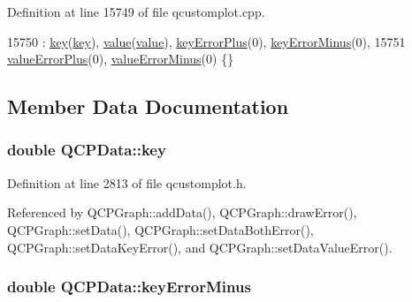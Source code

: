 Definition at line 15749 of file qcustomplot.\+cpp.


\begin{DoxyCode}
15750     : \hyperlink{class_q_c_p_data_a2f5ba9aca61bb74f88516e148a4cf71b}{key}(\hyperlink{class_q_c_p_data_a2f5ba9aca61bb74f88516e148a4cf71b}{key}), \hyperlink{class_q_c_p_data_aefe1ecf8fa2e34ed875b67523e542373}{value}(\hyperlink{class_q_c_p_data_aefe1ecf8fa2e34ed875b67523e542373}{value}), \hyperlink{class_q_c_p_data_ae468c3808107c2fd23052481156ab5b5}{keyErrorPlus}(0), 
      \hyperlink{class_q_c_p_data_af107d650b8ee5c3b2961ecddcfb1bccb}{keyErrorMinus}(0),
15751       \hyperlink{class_q_c_p_data_ad26912552d03485ea20d91dcad16aa8f}{valueErrorPlus}(0), \hyperlink{class_q_c_p_data_a51d8f42bf4d49a1f263531e70cadd6a3}{valueErrorMinus}(0) \{\}
\end{DoxyCode}


\subsection{Member Data Documentation}
\hypertarget{class_q_c_p_data_a2f5ba9aca61bb74f88516e148a4cf71b}{}
\subsubsection[{key}]{\setlength{\rightskip}{0pt plus 5cm}double Q\+C\+P\+Data\+::key}\label{class_q_c_p_data_a2f5ba9aca61bb74f88516e148a4cf71b}


Definition at line 2813 of file qcustomplot.\+h.



Referenced by Q\+C\+P\+Graph\+::add\+Data(), Q\+C\+P\+Graph\+::draw\+Error(), Q\+C\+P\+Graph\+::set\+Data(), Q\+C\+P\+Graph\+::set\+Data\+Both\+Error(), Q\+C\+P\+Graph\+::set\+Data\+Key\+Error(), and Q\+C\+P\+Graph\+::set\+Data\+Value\+Error().

\hypertarget{class_q_c_p_data_af107d650b8ee5c3b2961ecddcfb1bccb}{}
\subsubsection[{key\+Error\+Minus}]{\setlength{\rightskip}{0pt plus 5cm}double Q\+C\+P\+Data\+::key\+Error\+Minus}\label{class_q_c_p_data_af107d650b8ee5c3b2961ecddcfb1bccb}


